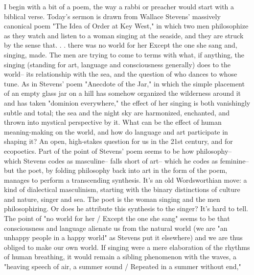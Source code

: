 \documentclass[draft]{article}
\makeatletter
\DeclareRobustCommand{\_}{%
  \ifmmode \nfss@text{\textunderscore}\else \BreakableUnderscore \fi}
\makeatother
\begin{document}

\shapepar\faceshape
I begin with a bit of a poem, the way a rabbi or preacher would start with a biblical verse.  Today's sermon is drawn from Wallace Stevens' massively canonical poem "The Idea of Order at Key West," in which two men philosophize as they watch and listen to a woman singing at the seaside, and they are struck by the sense that. . . there was no world for her Except the one she sang and, singing, made. The men are trying to come to terms with what, if anything, the singing (standing for art, language and consciousness generally) does to the world-- its relationship with the sea, and the question of who dances to whose tune.  As in Stevens' poem "Anecdote of the Jar," in which the simple placement of an empty glass jar on a hill has somehow organized the wilderness around it and has taken "dominion everywhere," the effect of her singing is both vanishingly subtle and total; the sea and the night sky are harmonized, enchanted, and thrown into mystical perspective by it. What can be the effect of human meaning-making on the world, and how do language and art participate in shaping it?  An open, high-stakes question for us in the 21st century, and for ecopoetics. Part of the point of Stevens' poem seems to be how philosophy-- which Stevens codes as masculine-- falls short of art-- which he codes as feminine-- but the poet, by folding philosophy back into art in the form of the poem, manages to perform a transcending synthesis.  It's an old Wordsworthian move: a kind of dialectical masculinism, starting with the binary distinctions of culture and nature, singer and sea.  The poet is the woman singing and the men philosophizing. Or does he attribute this synthesis to the singer?  It's hard to tell. The point of "no world for her / Except the one she sang" seems to be that consciousness and language alienate us from the natural world (we are "an unhappy people in a happy world" as Stevens put it elsewhere) and we are thus obliged to make our own world.  If singing were a mere elaboration of the rhythms of human breathing, it would remain a sibling phenomenon with the waves, a "heaving speech of air, a summer sound / Repeated in a summer without end,"
\end{document}
